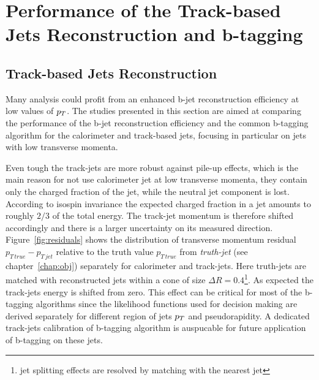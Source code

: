 \section[Performance of the Track-based Jets]{Performance of the Track-based Jets Reconstruction and b-tagging}\label{sec:tj_perf}
\subsection{Track-based Jets Reconstruction}
Many analysis could profit from an enhanced b-jet reconstruction efficiency at low values of $p_{T}$. 
The studies presented in this section are aimed at comparing the  performance of the b-jet reconstruction 
efficiency and the common b-tagging algorithm for the calorimeter and track-based jets, focusing in particular on jets 
with low transverse momenta.

Even tough the track-jets are more robust against  pile-up effects, which is the main reason for 
not use calorimeter jet at low transverse momenta, they contain only the charged fraction of the jet, 
while the neutral jet component is lost.
According to isospin invariance the expected charged fraction in a jet amounts to roughly $2/3$ of the total energy.
The track-jet momentum is therefore shifted accordingly and there is a larger 
uncertainty on its measured direction. Figure~\ref{fig:residuals} shows the 
distribution of transverse momentum residual $p_{T\,true} - p_{T\,jet}$ relative to the truth value $p_{T\,true}$ 
from \emph{truth-jet} (see chapter~\ref{chap:obj}) separately for calorimeter and track-jets.
Here truth-jets are matched with reconstructed jets within a cone of size  $\Delta R = 0.4$\footnote{jet splitting effects are resolved by matching with the nearest jet}.
As expected the track-jets energy is shifted from zero. This effect can be critical for most of the b-tagging algorithms 
since the likelihood functions used for decision making are derived separately for different region
of jets $p_{T}$ and pseudorapidity. A dedicated track-jets calibration of b-tagging algorithm is auspucable 
for  future application of b-tagging on these jets.

